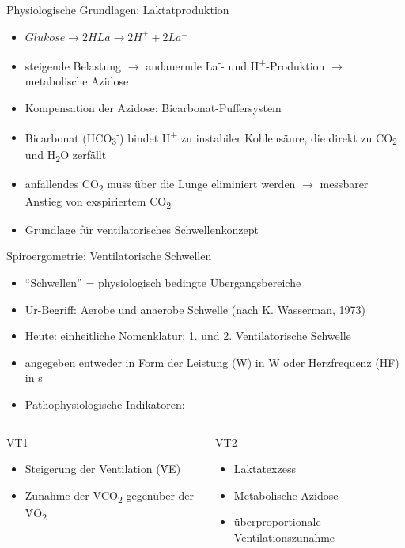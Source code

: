 \documentclass[colorBG,slideColor,9pt]{beamer}
\begin{document}
\begin{frame}{Physiologische Grundlagen: Laktatproduktion}
\begin{itemize}
\item $Glukose \rightarrow 2HLa \rightarrow 2H^+ + 2La^-$
\item steigende Belastung $\rightarrow$ andauernde La\textsuperscript{-}- und H\textsuperscript{+}-Produktion $\rightarrow$ metabolische Azidose
\item Kompensation der Azidose: Bicarbonat-Puffersystem
\item Bicarbonat (HCO\textsubscript{3}\textsuperscript{-}) bindet H\textsuperscript{+} zu instabiler Kohlensäure, die direkt zu CO\textsubscript{2} und H\textsubscript{2}O zerfällt
\item anfallendes CO\textsubscript{2} muss über die Lunge eliminiert werden $\rightarrow$ messbarer Anstieg von exspiriertem CO\textsubscript{2}
\item Grundlage für ventilatorisches Schwellenkonzept
\end{itemize}
\end{frame}

\begin{frame}{Spiroergometrie: Ventilatorische Schwellen}
\begin{itemize}
\item "`Schwellen"' = physiologisch bedingte Übergangsbereiche
\item Ur-Begriff: Aerobe und anaerobe Schwelle (nach K. Wasserman, 1973)
\item Heute: einheitliche Nomenklatur: 1. und 2. Ventilatorische Schwelle
\item angegeben entweder in Form der Leistung (W) in \si{\watt} oder Herzfrequenz (HF) in \si{\second}
\item Pathophysiologische Indikatoren:
\end{itemize}
\begin{columns}
\begin{column}[t]{5cm}
\begin{block}{VT1}
\begin{itemize}
\item Steigerung der Ventilation (\.{V}E)
\item Zunahme der \.{V}CO\textsubscript{2} gegenüber der \.{V}O\textsubscript{2}
\end{itemize}
\end{block}
\end{column}
\begin{column}[t]{5cm}
\begin{block}{VT2}
\begin{itemize}
\item Laktatexzess
\item Metabolische Azidose
\item überproportionale Ventilationszunahme
\end{itemize}
\end{block}
\end{column}
\end{columns}
\end{frame}
\end{document}
